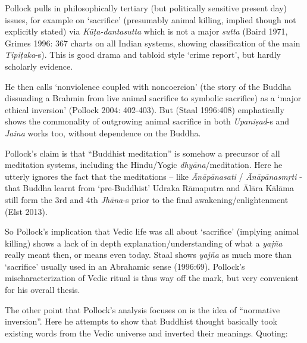 Pollock pulls in philosophically tertiary (but politically sensitive present day) issues, for example on ‘sacrifice’ (presumably animal killing, implied though not explicitly stated) via \textit{Kūṭa-dantasutta} which is not a major \textit{sutta} (Baird 1971, Grimes 1996: 367 charts on all Indian systems, showing classification of the main \textit{Tipiṭaka}-s). This is good drama and tabloid style ‘crime report’, but hardly scholarly evidence.

\newpage


He then calls ‘nonviolence coupled with noncoercion’ (the story of the Buddha dissuading a Brahmin from live animal sacrifice to symbolic sacrifice) as a ‘major ethical inversion’ (Pollock 2004: 402-403). But (Staal 1996:408) emphatically shows the commonality of outgrowing animal sacrifice in both \textit{Upaniṣad}-s and \textit{Jaina} works too, without dependence on the Buddha.

Pollock’s claim is that “Buddhist meditation” is somehow a precursor of all meditation systems, including the Hindu/Yogic \textit{dhyāna}/medita\-tion. Here he utterly ignores the fact that the meditations – like \textit{Ānāpānasati}
 / \textit{Ānāpānasmṛti} - that Buddha learnt from ‘pre-Buddhist’ Udraka Rāmaputra and Ālāra Kālāma still form the 3rd and 4th \textit{Jhāna}-s prior to the final awakening/enlightenment (Elst 2013).

So Pollock’s implication that Vedic life was all about ‘sacrifice’ (implying animal killing) shows a lack of in depth explanation/understanding of what a \textit{yajña} really meant then, or means even today. Staal shows \textit{yajña} as much more than ‘sacrifice’ usually used in an Abrahamic sense (1996:69). Pollock’s mischaracterization of Vedic ritual is thus way off the mark, but very convenient for his overall thesis.

The other point that Pollock’s analysis focuses on is the idea of “normative inversion”. Here he attempts to show that Buddhist thought basically took existing words from the Vedic universe and inverted their meanings. Quoting:


